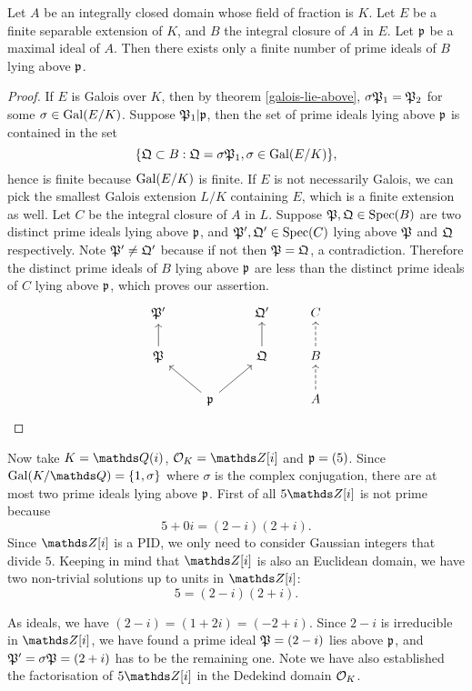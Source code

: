 			\begin{corollary} 
				Let $A$ be an integrally closed domain whose field of fraction is $K$. Let $E$ be a finite separable extension of $K$, and $B$ the integral closure of $A$ in $E$. Let $\mathfrak{p}$ be a maximal ideal of $A$. Then there exists only a finite number of prime ideals of $B$ lying above $\mathfrak{p}$.
			\end{corollary}
			\begin{proof}
				 If $E$ is Galois over $K$, then by theorem \ref{galois-lie-above}, $\sigma\mathfrak{P}_1 = \mathfrak{P}_2$ for some $\sigma \in \operatorname{Gal}(E/K)$. Suppose $\mathfrak{P}_1|\mathfrak{p}$, then the set of prime ideals lying above $\mathfrak{p}$ is contained in the set
				\[
					\{\mathfrak{Q} \subset B: \mathfrak{Q}=\sigma\mathfrak{P}_1,\sigma\in\operatorname{Gal}(E/K)\},
				\]
				hence is finite because $\operatorname{Gal}(E/K)$ is finite. If $E$ is not necessarily Galois, we can pick the smallest Galois extension $L/K$ containing $E$, which is a finite extension as well. Let $C$ be the integral closure of $A$ in $L$. Suppose $\mathfrak{P},\mathfrak{Q} \in \operatorname{Spec}(B)$ are two distinct prime ideals lying above $\mathfrak{p}$, and $\mathfrak{P}',\mathfrak{Q}' \in \operatorname{Spec}(C)$ lying above $\mathfrak{P}$ and $\mathfrak{Q}$ respectively. Note $\mathfrak{P}' \ne \mathfrak{Q}'$ because if not then $\mathfrak{P}=\mathfrak{Q}$, a contradiction. Therefore the distinct prime ideals of $B$ lying above $\mathfrak{p}$ are less than the distinct prime ideals of $C$ lying above $\mathfrak{p}$, which proves our assertion.
				\[
					\begin{tikzcd}
						\mathfrak{P}'          &                                    & \mathfrak{Q}'          & C                   \\
						\mathfrak{P} \arrow[u] &                                    & \mathfrak{Q} \arrow[u] & B \arrow[u, dashed] \\
						& \mathfrak{p} \arrow[lu] \arrow[ru] &                        & A \arrow[u, dashed]
					\end{tikzcd}
				\]
			\end{proof}
		\begin{example}\label{gauss-int-1}
			Now take $K=\Q(i)$, $\OK=\Z[i]$ and $\mathfrak{p}=(5)$. Since $\gal(K/\Q)=\{1,\sigma\}$ where $\sigma$ is the complex conjugation, there are at most two prime ideals lying above $\mathfrak{p}$. First of all $5\Z[i]$ is not prime because 
			\[
				5+0i = (2-i)(2+i).
			\]
			Since $\Z[i]$ is a PID, we only need to consider Gaussian integers that divide $5$. Keeping in mind that $\Z[i]$ is also an Euclidean domain, we have two non-trivial solutions up to units in $\Z[i]$:
			\[
				5 = (2-i)(2+i).
			\]
			
			As ideals, we have $(2-i)=(1+2i)=(-2+i)$. Since $2-i$ is irreducible in $\Z[i]$, we have found a prime ideal $\mathfrak{P}=(2-i)$ lies above $\mathfrak{p}$, and $\mathfrak{P}'=\sigma\mathfrak{P}=(2+i)$ has to be the remaining one. Note we have also established the factorisation of $5\Z[i]$ in the Dedekind domain $\mathcal{O}_K$.
				
		\end{example}
	
